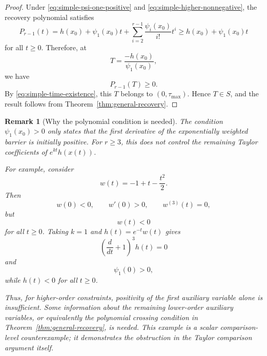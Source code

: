 \documentclass[11pt]{article}
\newtheorem{remark}{Remark}
\newcommand{\Dt}{\frac{d}{dt}}
\newcommand{\taumax}{\tau_{\max}}
\begin{document}
\begin{proof}
Under \eqref{eq:simple-psi-one-positive} and \eqref{eq:simple-higher-nonnegative}, the recovery polynomial satisfies
\begin{equation}
P_{r-1}(t)
=
h(x_0)
+
\psi_1(x_0)t
+
\sum_{i=2}^{r-1}
\frac{\psi_i(x_0)}{i!}t^i
\ge
h(x_0)+\psi_1(x_0)t
\end{equation}
for all $t\ge0$. Therefore, at
\begin{equation}
T=
\frac{-h(x_0)}{\psi_1(x_0)},
\end{equation}
we have
\begin{equation}
P_{r-1}(T)\ge0.
\end{equation}
By \eqref{eq:simple-time-existence}, this $T$ belongs to $(0,\taumax)$. Hence $T\in S$, and the result follows from Theorem~\ref{thm:general-recovery}.
\end{proof}

\begin{remark}[Why the polynomial condition is needed]
The condition $\psi_1(x_0)>0$ only states that the first derivative of the exponentially weighted barrier is initially positive. For $r\ge3$, this does not control the remaining Taylor coefficients of $e^{kt}h(x(t))$.

For example, consider
\begin{equation}
w(t)=-1+t-\frac{t^2}{2}.
\end{equation}
Then
\begin{equation}
w(0)<0,
\qquad
w'(0)>0,
\qquad
w^{(3)}(t)=0,
\end{equation}
but
\begin{equation}
w(t)<0
\end{equation}
for all $t\ge0$. Taking $k=1$ and $h(t)=e^{-t}w(t)$ gives
\begin{equation}
\left(\Dt+1\right)^3h(t)=0
\end{equation}
and
\begin{equation}
\psi_1(0)>0,
\end{equation}
while $h(t)<0$ for all $t\ge0$.

Thus, for higher-order constraints, positivity of the first auxiliary variable alone is insufficient. Some information about the remaining lower-order auxiliary variables, or equivalently the polynomial crossing condition in Theorem~\ref{thm:general-recovery}, is needed. This example is a scalar comparison-level counterexample; it demonstrates the obstruction in the Taylor comparison argument itself.
\end{remark}
\end{document}
